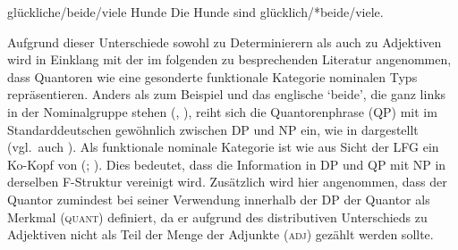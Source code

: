 \begin{exe}
\label{ex:beidedet}
\ex \begin{xlist}
		\label{ex:beidedet_1}
		\label{ex:beidedet_2}
		\label{ex:beidedet_3}
		\label{ex:beidedet_4}
\end{xlist}

\ex \begin{xlist}
	\ex glückliche/beide/viele Hunde
		\label{ex:beidepred_1}
	\ex Die Hunde sind glücklich/*beide/viele.
		\label{ex:beidepred_2}
\end{xlist}
\end{exe}

Aufgrund dieser Unterschiede sowohl zu 
Determinierern als auch zu Adjektiven
wird in Einklang mit der im folgenden zu besprechenden Literatur angenommen,
dass Quantoren wie  eine gesonderte funktionale Kategorie 
nominalen Typs repräsentieren. Anders als zum Beispiel  und das
englische  `beide', die ganz links in der Nominalgruppe
stehen (, ), reiht sich die
Quantorenphrase (QP) mit  im Standarddeutschen gewöhnlich zwischen
DP und NP ein, wie in  dargestellt
(vgl.~auch \cite[44--45 mit Fußnote 30]{lyons1999}). Als funktionale nominale
Kategorie ist  wie  aus Sicht der LFG ein Ko-Kopf von
 (; \cite[124]{bresnanetal2016}). Dies bedeutet, dass die
Information in DP und QP mit NP in derselben F-Struktur vereinigt wird. Zusätzlich wird hier angenommen, dass der Quantor
zumindest bei seiner Verwendung innerhalb der DP der Quantor als Merkmal
(\textsc{quant}) definiert, da er aufgrund des distributiven Unterschieds zu
Adjektiven nicht als Teil der Menge der Adjunkte (\textsc{adj})
gezählt werden sollte.

